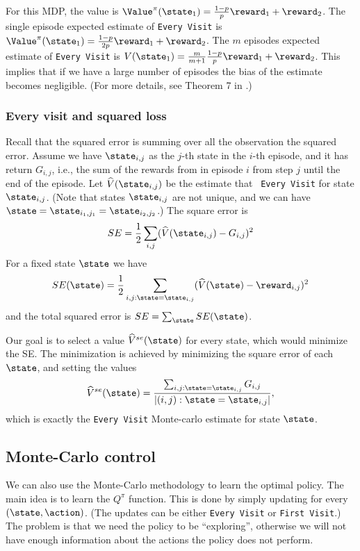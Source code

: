 For this MDP, the value is
$\Value^\pi(\state_1)=\frac{1-p}{p}\reward_1+\reward_2$. The single
episode expected estimate of {\tt Every Visit} is
$\Value^\pi(\state_1)=\frac{1-p}{2p}\reward_1+\reward_2$. The $m$
episodes expected estimate of {\tt Every Visit} is
$V(\state_1)=\frac{m}{m+1}\frac{1-p}{p}\reward_1+\reward_2$. This
implies that if we have a large number of episodes the bias of the
estimate becomes negligible. (For more details, see Theorem 7 in
\cite{SinghS96}.)

\subsubsection*{Every visit and squared loss}

Recall that the squared error is summing over all the observation
the squared error. Assume we have $\state_{i,j}$ as the $j$-th state
in the $i$-th episode, and it has return $G_{i,j}$, i.e., the sum of
the rewards from in episode $i$ from step $j$ until the end of the
episode. Let $\widehat{V}(\state_{i,j})$ be the estimate that {\tt
Every Visit} for state $\state_{i,j}$. (Note that states
$\state_{i,j}$ are not unique, and we can have
$\state=\state_{i_1,j_1}=\state_{i_2,j_2}$.) The square error is
\[
SE=\frac{1}{2}\sum_{i,j} (\widehat{V}(\state_{i,j})-G_{i,j})^2
\]
For a fixed state $\state$ we have
\[
SE(\state)=\frac{1}{2}\sum_{i,j:\state=\state_{i,j}}
(\widehat{V}(\state)-\reward_{i,j})^2
\]
and the total squared error is $SE=\sum_\state SE(\state)$.

Our goal is to select a value $\widehat{V}^{se}(\state)$ for every
state, which would minimize the SE. The minimization is achieved by
minimizing the square error of each $\state$, and setting the values
\[
\widehat{V}^{se}(\state)=\frac{\sum_{i,j:\state=\state_{i,j}}
G_{i,j}}{|{(i,j):\state=\state_{i,j}}|},
\]
which is exactly the {\tt Every Visit} Monte-carlo estimate for
state $\state$.

\subsection{Monte-Carlo control}

We can also use the Monte-Carlo methodology to learn the optimal
policy.
%
The main idea is to learn the $Q^\pi$ function. This is done by
simply updating for every $(\state,\action)$. (The updates can be
either {\tt Every Visit} or {\tt First Visit}.) The problem is that
we need the policy to be ``exploring'', otherwise we will not have
enough information about the actions the policy does not perform.

